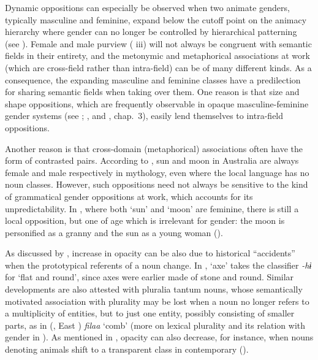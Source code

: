\documentclass[output=collectionpaper]{langsci/langscibook}
\begin{document}
Dynamic oppositions can especially be observed when two animate genders, typically masculine and feminine, expand below the cutoff point on the animacy hierarchy where gender can no longer be controlled by hierarchical patterning (see ). Female and male purview ( iii) will not always be congruent with semantic fields in their entirety, and the metonymic and metaphorical associations at work (which are cross-field rather than intra-field) can be of many different kinds. As a consequence, the expanding masculine and feminine classes have a predilection for sharing semantic fields when taking over them. One reason is that size and shape oppositions, which are frequently observable in opaque masculine-feminine gender systems (see ; , and \citealt{Aikhenvald2016}, chap.~3), easily lend themselves to intra-field oppositions.

Another reason is that cross-domain (metaphorical) associations often have the form of contrasted pairs. According to \cite[49]{Capell1970}, sun and moon in Australia are always female and male respectively in mythology, even where the local language has no noun classes. However, such oppositions need not always be sensitive to the kind of grammatical gender oppositions at work, which accounts for its unpredictability. In , where both `sun' and `moon' are feminine, there is still a local opposition, but one of age which is irrelevant for gender: the moon is personified as a granny and the sun as a young woman (\citealt[57]{Haas1940}).

As discussed by \cite[21]{Seifart2018}, increase in opacity can be also due to historical ``accidents'' when the prototypical referents of a noun change. In , `axe' takes the classifier \textit{-hɨ} for `flat and round', since axes were earlier made of stone and round. Similar developments are also attested with pluralia tantum nouns, whose semantically motivated association with plurality may be lost when a noun no longer refers to a multiplicity of entities, but to just one entity, possibly consisting of smaller parts, as in  (, East ) \textit{filaa} `comb' (more on lexical plurality and its relation with gender in ). As mentioned in , opacity can also decrease, for instance, when nouns denoting animals shift to a transparent class in contemporary   (\citealt[24]{Seifart2018}).
\end{document}
